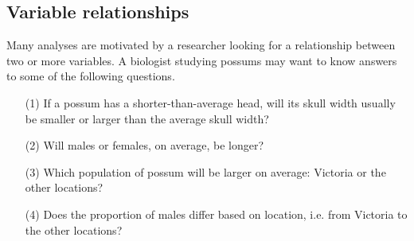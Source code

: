 \subsection{Variable relationships}
\label{variableRelations}

Many analyses are motivated by a researcher looking for a relationship between two or more variables. A biologist studying possums may want to know answers to some of the following questions.
\begin{enumerate}
\item[(1)]\label{questionAboutPossumHeadLengthAndWidth} If a possum has a shorter-than-average head, will its skull width usually be smaller or larger than the average skull width? \label{possumHeadSizeQuestion}
\item[(2)]\label{maleOrFemalePossumsLonger} Will males or females, on average, be longer? \label{possibleCausationQuestionForPossums}
\item[(3)]\label{whichPopulationOfPossumWillBeLargerOnAverage} Which population of possum will be larger on average: Victoria or the other locations?
\item[(4)]\label{doesTheProportionOfMalesDifferBasedOnLocation} Does the proportion of males differ based on location, i.e. from Victoria to the other locations?
\end{enumerate}

